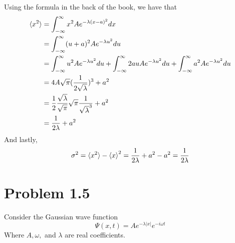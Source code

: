 \documentclass{article}
\begin{document}
\begin{enumerate}[label=(\alph*)]
      Using the formula in the back of the book, we have that
      \begin{align*}
        \braket{x^2} &= \int_{-\infty}^\infty x^2 Ae^{-\lambda (x - a)^2} dx \\
                     &= \int_{-\infty}^\infty (u + a)^2 Ae^{-\lambda u^2} du \\
                     &= \int_{-\infty}^\infty u^2 A e^{-\lambda u^2}du + \int_{-\infty}^\infty 2auAe^{-\lambda u^2}du + \int_{-\infty}^\infty a^2Ae^{-\lambda u^2}du \\
                     &= 4A\sqrt{\pi}(\frac{1}{2\sqrt{\lambda}})^3  + a^2 \\
                     &= \frac{1}{2} \frac{\sqrt\lambda}{\sqrt\pi} \sqrt{\pi} \frac{1}{\sqrt{\lambda}^3} + a^2 \\
                     &= \frac{1}{2 \lambda} + a^2
      \end{align*}
      And lastly, 
      \begin{align*}
        \sigma^2 = \braket{x^2} - \braket{x}^2 = \frac{1}{2\lambda} + a^2 - a^2 = \frac{1}{2\lambda}
      \end{align*}
  \end{enumerate}


\section{Problem 1.5}
  Consider the Gaussian wave function
  \[ \Psi(x, t) = Ae^{-\lambda |x|}e^{-i\omega t} \]
  Where $A, \omega,$ and $\lambda$ are real coefficients.
\end{document}
